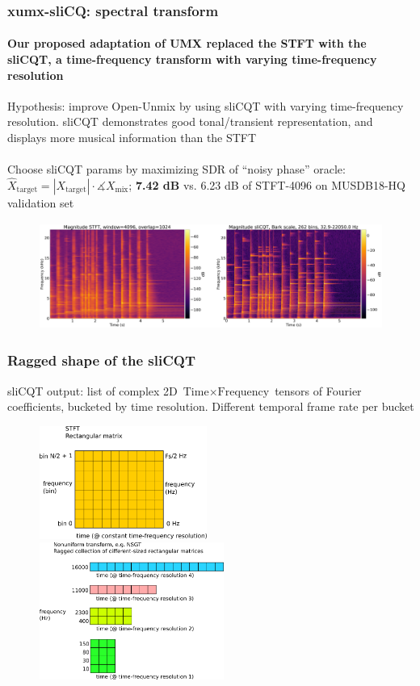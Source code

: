 \documentclass[usenames,dvipsnames]{beamer}
\begin{document}
\begin{frame}
	\frametitle{xumx-sliCQ: spectral transform}
	\framesubtitle{Our proposed adaptation of UMX replaced the STFT with the sliCQT, a time-frequency transform with varying time-frequency resolution}
	Hypothesis: improve Open-Unmix by using sliCQT with varying time-frequency resolution. sliCQT demonstrates good tonal/transient representation, and displays more musical information than the STFT\\\ \\
	Choose sliCQT params by maximizing SDR of ``noisy phase'' oracle: $\hat{X}_{\text{target}} = |X_{\text{target}}| \cdot \measuredangle{X_{\text{mix}}}$; \textbf{7.42 dB} vs. 6.23 dB of STFT-4096 on MUSDB18-HQ validation set
	\begin{figure}[ht]
		\centering
		\vspace{-0.5em}
		\includegraphics[height=3.5cm]{./images-mila-presentation/spectrograms_comparison.png}
	\end{figure}
\end{frame}

\begin{frame}
	\frametitle{Ragged shape of the sliCQT}
	sliCQT output: list of complex 2D $\text{Time} \times \text{Frequency}$ tensors of Fourier coefficients, bucketed by time resolution. Different temporal frame rate per bucket
	\begin{figure}
		\centering
		\includegraphics[height=3.7cm]{./images-blockdiagrams/stftslicqtcmp1.png}
		\hspace{-0.25em}
		\includegraphics[height=4.5cm]{./images-blockdiagrams/stftslicqtcmp2.png}
	\end{figure}
\end{frame}
\end{document}
